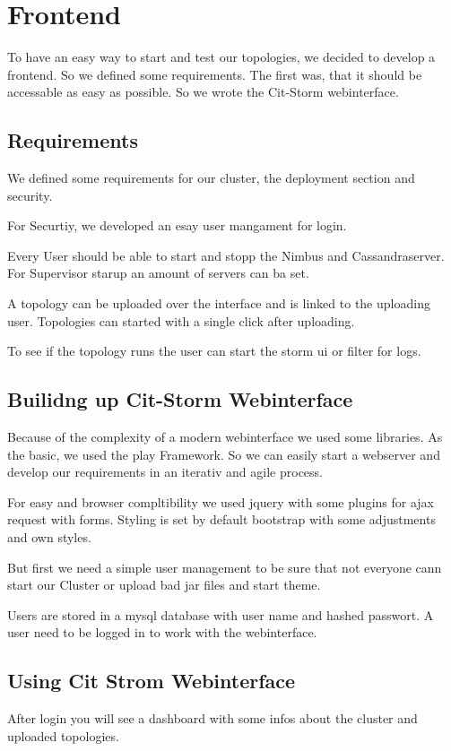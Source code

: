 \section{Frontend}
\label{sect:frontend}

To have an easy way to start and test our topologies, we decided to develop a frontend. So we defined some requirements. The first was, that it should be accessable as easy as possible. So we wrote the Cit-Storm webinterface.

\subsection{Requirements}
We defined some requirements for our cluster, the deployment section and security.

For Securtiy, we developed an esay user mangament for login.

Every User should be able to start and stopp the Nimbus and Cassandraserver. For Supervisor starup an amount of servers can ba set.

A topology can be uploaded over the interface and is linked to the uploading user. Topologies can started with a single click after uploading.

To see if the topology runs the user can start the storm ui or filter for logs.

\subsection{Builidng up Cit-Storm Webinterface}
Because of the complexity of a modern webinterface we used some libraries. As the basic, we used the play Framework. So we can easily start a webserver and develop our requirements in an iterativ and agile process.

For easy and browser compltibility we used jquery with some plugins for ajax request with forms. Styling is set by default bootstrap with some adjustments and own styles.

But first we need a simple user management to be sure that not everyone cann start our Cluster or upload bad jar files and start theme.

Users are stored in a mysql database with user name and hashed passwort. A user need to be logged in to work with the webinterface.

\subsection{Using Cit Strom Webinterface}
After login you will see a dashboard with some infos about the cluster and uploaded topologies.

